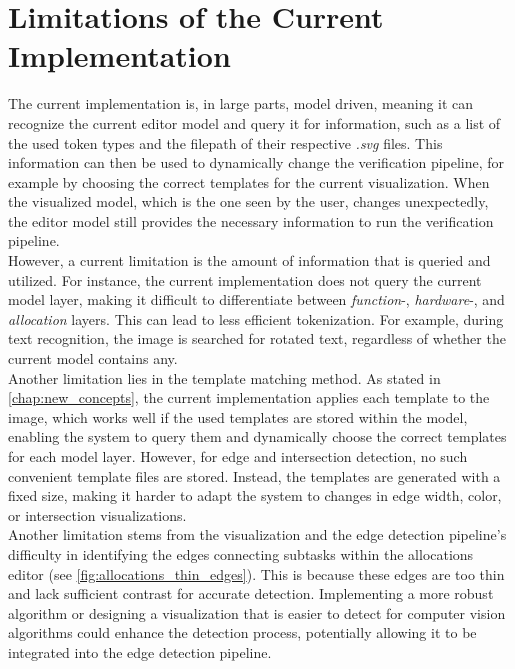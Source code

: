 \section{Limitations of the Current Implementation}
The current implementation is, in large parts, model driven, meaning it can recognize the current editor model and query it for information, such as a list of the used token types and the filepath of their respective \textit{.svg} files. This information can then be used to dynamically change the verification pipeline, for example by choosing the correct templates for the current visualization. When the visualized model, which is the one seen by the user, changes unexpectedly, the editor model still provides the necessary information to run the verification pipeline.\\
However, a current limitation is the amount of information that is queried and utilized. For instance, the current implementation does not query the current model layer, making it difficult to differentiate between \textit{function}-, \textit{hardware}-, and \textit{allocation} layers. This can lead to less efficient tokenization. For example, during text recognition, the image is searched for rotated text, regardless of whether the current model contains any.\\
Another limitation lies in the template matching method. As stated in \autoref{chap:new_concepts}, the current implementation applies each template to the image, which works well if the used templates are stored within the model, enabling the system to query them and dynamically choose the correct templates for each model layer. However, for edge and intersection detection, no such convenient template files are stored. Instead, the templates are generated with a fixed size, making it harder to adapt the system to changes in edge width, color, or intersection visualizations.\\
Another limitation stems from the visualization and the edge detection pipeline's difficulty in identifying the edges connecting subtasks within the allocations editor (see \autoref{fig:allocations_thin_edges}). This is because these edges are too thin and lack sufficient contrast for accurate detection. Implementing a more robust algorithm or designing a visualization that is easier to detect for computer vision algorithms could enhance the detection process, potentially allowing it to be integrated into the edge detection pipeline.\\

